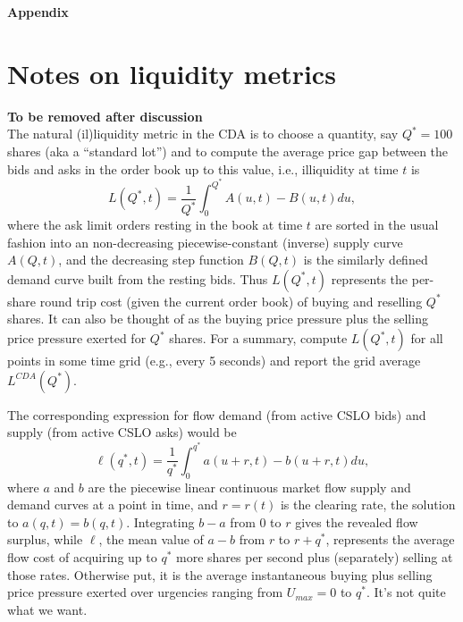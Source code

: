 \begin{singlespace}
\appendix
\setcounter{page}{1}
\begin{center}
    \huge \textbf{Appendix}
    
\end{center}

\section*{Notes on liquidity metrics}

\textbf{To be removed after discussion}\\
The natural (il)liquidity metric in the CDA is to choose a quantity, say $Q^*=100$ shares (aka a ``standard lot'') and to compute the average price gap between the bids and asks in the order book up to this value,
i.e., illiquidity at time $t$ is
\begin{equation}\label{eq:Liqcda}
    L(Q^*,t) = \frac{1}{Q^*}\int_0^{Q^*} A(u,t) - B(u,t) du,
\end{equation}
where the ask limit orders resting in the book at time $t$ are sorted in the usual fashion into an non-decreasing piecewise-constant (inverse) supply curve $A(Q,t)$,
and the decreasing step function $B(Q,t)$ is the similarly defined demand curve built from the resting bids. 
Thus $L(Q^*,t)$ represents the per-share round trip cost (given the current order book) of buying and reselling $Q^*$ shares. 
It can also be thought of as the buying price pressure plus the selling price pressure exerted for $Q^*$ shares.
For a summary, compute $L(Q^*,t)$ for all points in some time grid (e.g., every 5 seconds) and report the grid average $L^{CDA}(Q^*)$.

The corresponding expression for flow demand (from active CSLO bids) and supply (from active CSLO asks) would be
\begin{equation}\label{eq:Liqflowa}
    \ell (q^*,t) = \frac{1}{q^*}\int_0^{q^*} a(u+r,t) - b(u+r,t) du,
\end{equation}
where $a$ and $b$ are the piecewise linear continuous market flow supply and demand curves at a point in time, and $r=r(t)$ is the clearing rate, the solution to $a(q,t) = b(q,t)$. Integrating $b-a$ from 0 to $r$ gives the revealed flow surplus, while $\ell$, the mean value of $a-b$ from $r$ to $r+q^*$, represents the average flow cost of acquiring up to $q^*$ more shares per second plus (separately) selling at those rates. Otherwise put, it is the average instantaneous buying plus selling price pressure exerted over urgencies ranging from $U_{max} = 0$ to $q^*$. It's not quite what we want.


\end{singlespace}
